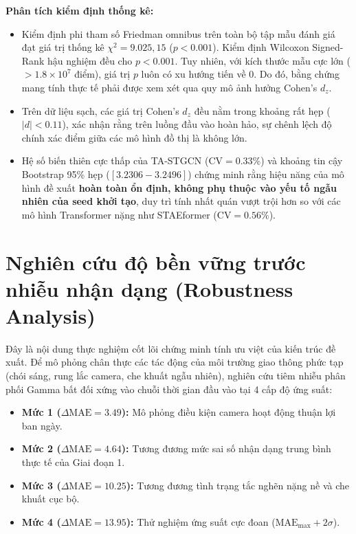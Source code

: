 \textbf{Phân tích kiểm định thống kê:}
\begin{itemize}
    \item Kiểm định phi tham số Friedman omnibus trên toàn bộ tập mẫu đánh giá đạt giá trị thống kê $\chi^2 = 9.025,15$ ($p < 0.001$). Kiểm định Wilcoxon Signed-Rank hậu nghiệm đều cho $p < 0.001$. Tuy nhiên, với kích thước mẫu cực lớn ($> 1.8 \times 10^7$ điểm), giá trị $p$ luôn có xu hướng tiến về 0. Do đó, bằng chứng mang tính thực tế phải được xem xét qua quy mô ảnh hưởng Cohen's $d_z$.
    \item Trên dữ liệu sạch, các giá trị Cohen's $d_z$ đều nằm trong khoảng rất hẹp ($|d| < 0.11$), xác nhận rằng trên luồng đầu vào hoàn hảo, sự chênh lệch độ chính xác điểm giữa các mô hình đồ thị là không lớn.
    \item Hệ số biến thiên cực thấp của TA-STGCN ($\text{CV} = 0.33\%$) và khoảng tin cậy Bootstrap 95\% hẹp ($[3.2306 - 3.2496]$) chứng minh rằng hiệu năng của mô hình đề xuất \textbf{hoàn toàn ổn định, không phụ thuộc vào yếu tố ngẫu nhiên của seed khởi tạo}, duy trì tính nhất quán vượt trội hơn so với các mô hình Transformer nặng như STAEformer ($\text{CV} = 0.56\%$).
\end{itemize}

\section{Nghiên cứu độ bền vững trước nhiễu nhận dạng (Robustness Analysis)}
\label{sec:nghien_cuu_do_ben_vung_nhieu}

Đây là nội dung thực nghiệm cốt lõi chứng minh tính ưu việt của kiến trúc đề xuất. Để mô phỏng chân thực các tác động của môi trường giao thông phức tạp (chói sáng, rung lắc camera, che khuất ngẫu nhiên), nghiên cứu tiêm nhiễu phân phối Gamma bất đối xứng vào chuỗi thời gian đầu vào tại 4 cấp độ ứng suất:
\begin{itemize}
    \item \textbf{Mức 1 ($\Delta\text{MAE} = 3.49$):} Mô phỏng điều kiện camera hoạt động thuận lợi ban ngày.
    \item \textbf{Mức 2 ($\Delta\text{MAE} = 4.64$):} Tương đương mức sai số nhận dạng trung bình thực tế của Giai đoạn 1.
    \item \textbf{Mức 3 ($\Delta\text{MAE} = 10.25$):} Tương đương tình trạng tắc nghẽn nặng nề và che khuất cục bộ.
    \item \textbf{Mức 4 ($\Delta\text{MAE} = 13.95$):} Thử nghiệm ứng suất cực đoan ($\text{MAE}_{\max} + 2\sigma$).
\end{itemize}

